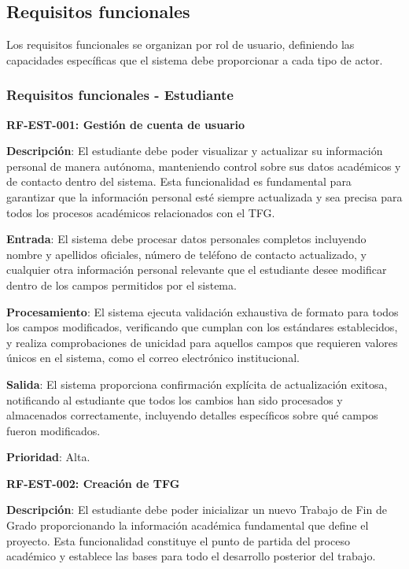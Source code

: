\documentclass[12pt,a4paper,oneside]{report}
\begin{document}
\subsection{Requisitos funcionales}\label{requisitos-funcionales}

Los requisitos funcionales se organizan por rol de usuario, definiendo
las capacidades específicas que el sistema debe proporcionar a cada tipo
de actor.

\subsubsection{Requisitos funcionales -
Estudiante}\label{requisitos-funcionales---estudiante}

\textbf{RF-EST-001: Gestión de cuenta de usuario}

\textbf{Descripción}: El estudiante debe poder visualizar y actualizar su información personal de manera autónoma, manteniendo control sobre sus datos académicos y de contacto dentro del sistema. Esta funcionalidad es fundamental para garantizar que la información personal esté siempre actualizada y sea precisa para todos los procesos académicos relacionados con el TFG.

\textbf{Entrada}: El sistema debe procesar datos personales completos incluyendo nombre y apellidos oficiales, número de teléfono de contacto actualizado, y cualquier otra información personal relevante que el estudiante desee modificar dentro de los campos permitidos por el sistema.

\textbf{Procesamiento}: El sistema ejecuta validación exhaustiva de formato para todos los campos modificados, verificando que cumplan con los estándares establecidos, y realiza comprobaciones de unicidad para aquellos campos que requieren valores únicos en el sistema, como el correo electrónico institucional.

\textbf{Salida}: El sistema proporciona confirmación explícita de actualización exitosa, notificando al estudiante que todos los cambios han sido procesados y almacenados correctamente, incluyendo detalles específicos sobre qué campos fueron modificados.

\textbf{Prioridad}: Alta.

\textbf{RF-EST-002: Creación de TFG}

\textbf{Descripción}: El estudiante debe poder inicializar un nuevo Trabajo de Fin de Grado proporcionando la información académica fundamental que define el proyecto. Esta funcionalidad constituye el punto de partida del proceso académico y establece las bases para todo el desarrollo posterior del trabajo.
\end{document}
